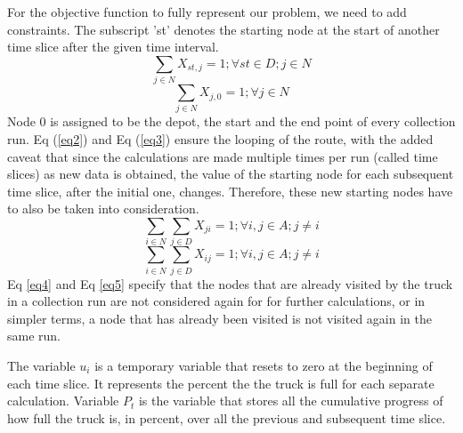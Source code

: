 \documentclass[12pt]{article}
\begin{document}
For the objective function to fully represent our problem, we need to add constraints. The subscript 'st' denotes the starting node at the start of another time slice after the given time interval.
\begin{equation}\label{eq2}
    \sum_{j\in N}X_{st,j}=1 ; \forall st \in D ; j \in N
\end{equation}
\begin{equation}\label{eq3}
    \sum_{j\in N}X_{j,0}=1 ; \forall j \in N
\end{equation}
Node 0 is assigned to be the depot, the start and the end point of every collection run. Eq (\ref{eq2}) and Eq (\ref{eq3}) ensure the looping of the route, with the added caveat that since the calculations are made multiple times per run (called time slices) as new data is obtained, the value of the starting node for each subsequent time slice, after the initial one, changes. Therefore, these new starting nodes have to also be taken into consideration.
\begin{equation}\label{eq4}
    \sum_{i\in N}\sum_{j\in D } X_{ji}=1 ; \forall i,j \in A ; j\ne i
\end{equation}
\begin{equation}\label{eq5}
    \sum_{i\in N}\sum_{j\in D } X_{ij}=1 ; \forall i,j \in A ; j\ne i
\end{equation}
Eq \eqref{eq4} and Eq \eqref{eq5} specify that the nodes that are already visited by the truck in a collection run are not considered again for for further calculations, or in simpler terms, a node that has already been visited is not visited again in the same run.

The variable $u_i$ is a temporary variable that resets to zero at the beginning of each time slice. It represents the percent the the truck is full for each separate calculation. Variable $P_t$ is the variable that stores all the cumulative progress of how full the truck is, in percent, over all the previous and subsequent time slice.
\end{document}
